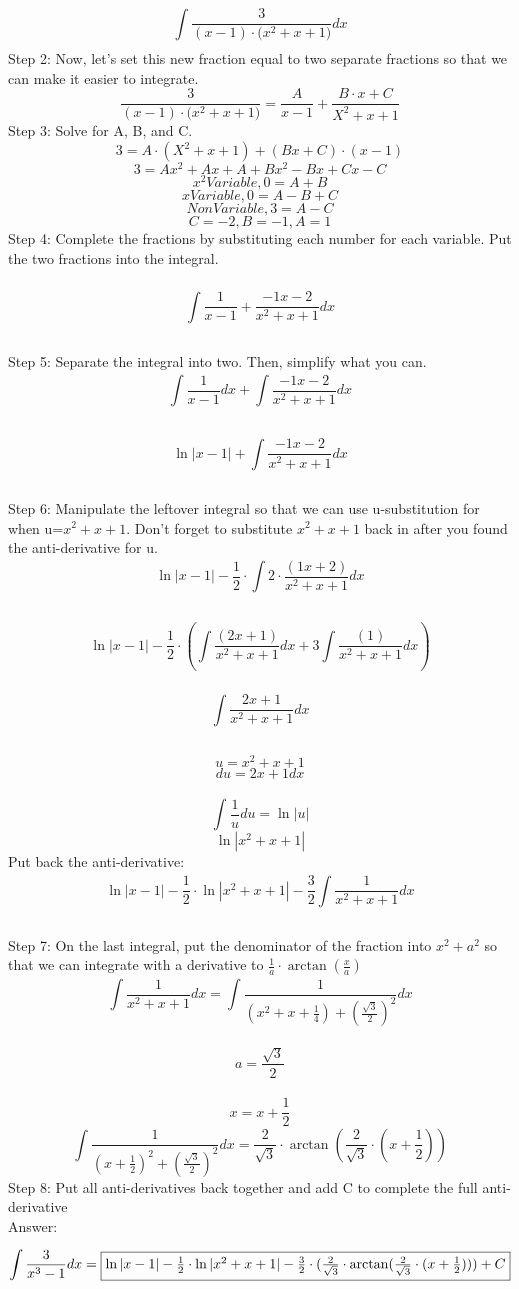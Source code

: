 \documentclass[a4paper,openright, 10pt]{article}
\begin{document}
$$\int\limits_{}^{}\frac{3}{(x-1)\cdot{(x^{2}+x+1})}dx $$
Step 2: Now, let's set this new fraction equal to two separate fractions so that we can make it easier to integrate.\\
$$\frac{3}{(x-1)\cdot{(x^{2}+x+1})}= \frac{A}{x-1} +\frac{B\cdot{x}+C}{X^{2}+x+1}$$
Step 3: Solve for A, B, and C.
$$3=A\cdot(X^{2}+x+1)+(Bx+C)\cdot(x-1)$$
$$3=Ax^{2}+Ax+A+Bx^{2}-Bx+Cx-C$$
$$x^2 Variable , 0=A+B$$
$$x Variable, 0=A-B+C$$
$$Non Variable, 3=A-C$$
$$C=-2,B=-1,A=1$$
Step 4: Complete the fractions by substituting each number for each variable. Put the two fractions into the integral.\\\\
$$\int\limits_{}^{}\frac{1}{x-1}+\frac{-1x-2}{x^{2}+x+1}dx$$\\
Step 5: Separate the integral into two. Then, simplify what you can.
$$\int\limits_{}^{}\frac{1}{x-1}dx+\int\limits_{}^{}\frac{-1x-2}{x^{2}+x+1}dx$$\\
$$\ln{|x-1|}+\int\limits_{}^{}\frac{-1x-2}{x^{2}+x+1}dx$$\\
Step 6: Manipulate the leftover integral so that we can use u-substitution for when u=$x^{2}+x+1$. Don't forget to substitute $x^{2}+x+1$ back in after you found the anti-derivative for u.
$$\ln{|x-1|}-\frac{1}{2}\cdot\int\limits_{}^{}2\cdot\frac{(1x+2)}{x^{2}+x+1}dx$$\\
$$\ln{|x-1|}-\frac{1}{2}\cdot(\int\limits_{}^{}\frac{(2x+1)}{x^{2}+x+1}dx+3\int\limits_{}^{}\frac{(1)}{x^{2}+x+1}dx)$$\\
$$\int\limits_{}^{}\frac{2x+1}{x^{2}+x+1}dx$$\\
$$u=x^{2}+x+1$$ $$du=2x+1dx$$\\
$$\int\limits{}^{}\frac{1}{u}du=\ln{|u|}$$
$$\ln{|x^{2}+x+1|}$$
Put back the anti-derivative:$$\ln{|x-1|}-\frac{1}{2}\cdot\ln{|x^{2}+x+1|}-\frac{3}{2}\int\limits_{}^{}\frac{1}{x^{2}+x+1}dx$$\\
Step 7: On the last integral, put the denominator of the fraction into $x^2 + a^2$ so that we can integrate with a derivative to $\frac{1}{a}\cdot\arctan{(\frac{x}{a})}$ 
$$\int\limits_{}^{}\frac{1}{x^{2}+x+1}dx=\int\limits_{}^{}\frac{1}{(x^{2}+x+\frac{1}{4})+(\frac{\sqrt{3}}{2})^{2}}dx$$\\
$$a=\frac{\sqrt{3}}{2}$$\\
$$x=x+\frac{1}{2}$$
$$\int\limits_{}^{}\frac{1}{(x+\frac{1}{2})^{2}+(\frac{\sqrt{3}}{2})^{2}}dx=\frac{2}{\sqrt{3}}\cdot\arctan(\frac{2}{\sqrt{3}}\cdot(x+\frac{1}{2}))$$
Step 8: Put all anti-derivatives back together and add C to complete the full anti-derivative\\
Answer: $$\int\limits_{}^{}\frac{3}{x^{3}-1}dx  =\fbox{$\ln{|x-1|}-\frac{1}{2}\cdot\ln{|x^{2}+x+1|}-\frac{3}{2}\cdot(\frac{2}{\sqrt{3}}\cdot\arctan(\frac{2}{\sqrt{3}}\cdot(x+\frac{1}{2})))+C$}$$
\end{document}

